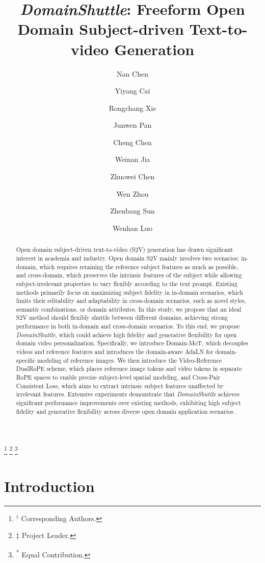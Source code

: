 \documentclass{llmxive}
\title{\textit{DomainShuttle}: Freeform Open Domain Subject-driven Text-to-video Generation}
\author{Nan Chen \and Yiyang Cai \and Rongchang Xie \and Junwen Pan \and Cheng Chen \and Weinan Jia \and Zhuowei Chen \and Wen Zhou \and Zhenbang Sun \and Wenhan Luo}
\providecommand{\blfootnote}[1]{\footnote{#1}}
\begin{document}
\maketitle
\begin{abstract}
Open domain subject-driven text-to-video (S2V) generation has drawn significant interest in academia and industry. Open domain S2V mainly involves two scenarios: in-domain, which requires retaining the reference subject features as much as possible, and cross-domain, which preserves the intrinsic features of the subject while allowing subject-irrelevant properties to vary flexibly according to the text prompt. Existing methods primarily focus on maximizing subject fidelity in in-domain scenarios, which limits their editability and adaptability in cross-domain scenarios, such as novel styles, semantic combinations, or domain attributes. In this study, we propose that an ideal S2V method should flexibly shuttle between different domains, achieving strong performance in both in-domain and cross-domain scenarios. To this end, we propose \textit{DomainShuttle}, which could achieve high fidelity and generative flexibility for open domain video personalization. Specifically, we introduce Domain-MoT, which decouples videos and reference features and introduces the domain-aware AdaLN for domain-specific modeling of reference images. We then introduce the Video-Reference DualRoPE scheme, which places reference image tokens and video tokens in separate RoPE spaces to enable precise subject-level spatial modeling, and Cross-Pair Consistent Loss, which aims to extract intrinsic subject features unaffected by irrelevant features. Extensive experiments demonstrate that \textit{DomainShuttle} achieves significant performance improvements over existing methods, exhibiting high subject fidelity and generative flexibility across diverse open domain application scenarios.
\end{abstract}
\blfootnote{$^\dagger$ Corresponding Authors.}
\blfootnote{$\ddagger$ Project Leader.}
\blfootnote{\textsuperscript{*} Equal Contribution.}


\section{Introduction}
\end{document}
